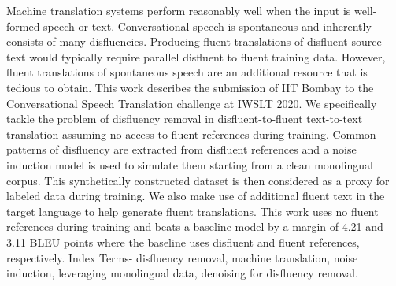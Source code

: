 Machine translation systems perform reasonably well when the input is well-formed speech or text. Conversational speech is spontaneous and inherently consists of many disfluencies. Producing fluent translations of disfluent source text would typically require parallel disfluent to fluent training data. However, fluent translations of spontaneous speech are an additional resource that is tedious to obtain. This work describes the submission of IIT Bombay to the Conversational Speech Translation challenge at IWSLT 2020. We specifically tackle the problem of disfluency removal in disfluent-to-fluent text-to-text translation assuming no access to fluent references during training. Common patterns of disfluency are extracted from disfluent references and a noise induction model is used to simulate them starting from a clean monolingual corpus. This synthetically constructed dataset is then considered as a proxy for labeled data during training. We also make use of additional fluent text in the target language to help generate fluent translations. This work uses no fluent references during training and beats a baseline model by a margin of 4.21 and 3.11 BLEU points where the baseline uses disfluent and fluent references, respectively. Index Terms- disfluency removal, machine translation, noise induction, leveraging monolingual data, denoising for disfluency removal.
